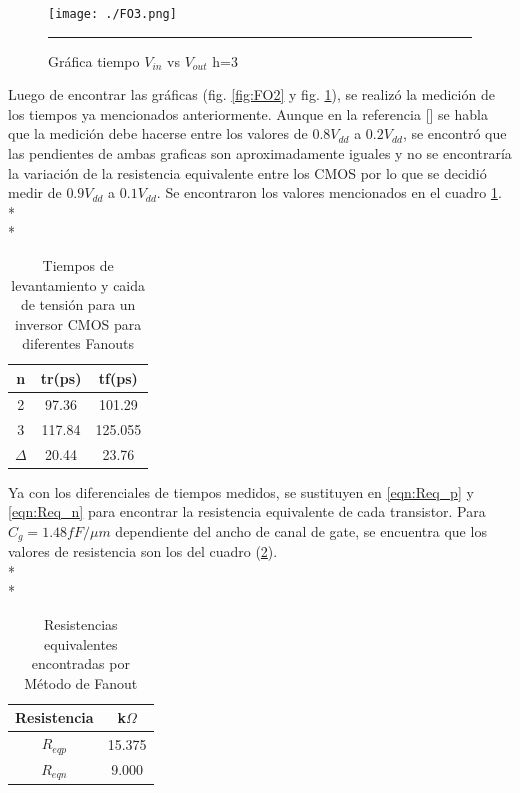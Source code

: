 \documentclass[12pt,a4paper]{article} %
\begin{document}
{\begin{figure}[htbp]
\begin{center}
\end{center}
\end{figure}

\begin{figure}[htbp]
  \begin{center}
    \texttt{[image: ./FO3.png]}
    \rule{35em}{0.5pt}
  \caption[Captura]{Gráfica tiempo $V_{in}$ vs $V_{out}$ h=3}
  \label{fig:FO3}
  \end{center}
\end{figure}

Luego de encontrar las gráficas (fig. \ref{fig:FO2} y fig. \ref{fig:FO3}), se realizó la medición de los tiempos ya mencionados anteriormente. Aunque en la referencia [] se habla que la medición debe hacerse entre los valores de $0.8V_{dd}$ a $0.2V_{dd}$, se encontró que las pendientes de ambas graficas son aproximadamente iguales y no se encontraría la variación de la resistencia equivalente entre los CMOS por lo que se decidió medir de $0.9V_{dd}$ a $0.1V_{dd}$. Se encontraron los valores mencionados en el cuadro \ref{table:tiempos}. \\*
\\*
\begin{table}\label{table:tiempos}
\begin{center}
\begin{tabular}{c||c||c}
n & tr(ps) & tf(ps)\\
\hline
\hline
2 & 97.36 & 101.29 \\
3 & 117.84 & 125.055 \\
$\Delta$ & 20.44 & 23.76\\
\hline
\end{tabular}
\caption{Tiempos de levantamiento y caida de tensión para un inversor CMOS para diferentes Fanouts}
\end{center}
\end{table}


Ya con los diferenciales de tiempos medidos, se sustituyen en \ref{eqn:Req_p} y \ref{eqn:Req_n} para encontrar la resistencia equivalente de cada transistor. Para $C_{g}=1.48 fF/\mu m$  dependiente del ancho de canal de gate, se encuentra que los valores de resistencia son los del cuadro (\ref{table:resistencias}). \\*
\\*
\begin{table}\label{table:resistencias}
\begin{center}
\begin{tabular}{c||c}
Resistencia & k$\Omega$\\
\hline
\hline
$R_{eqp}$ & 15.375 \\
$R_{eqn}$ & 9.000 \\
\hline
\end{tabular}
\caption{Resistencias equivalentes encontradas por Método de Fanout}
\end{center}
\end{table}




}
\end{document}
